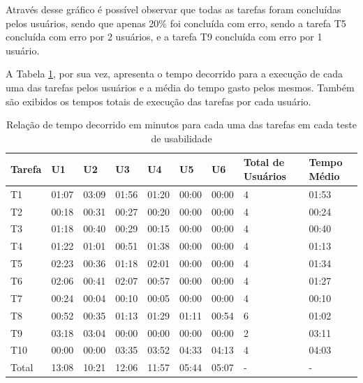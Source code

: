 Através desse gráfico é possível observar que todas as tarefas foram concluídas pelos 
usuários, sendo que apenas 20\% foi concluída com erro, sendo a tarefa T5 concluída com 
erro por 2 usuários, e a tarefa T9 concluída com erro por 1 usuário.

A Tabela \ref{table:tempos-execucao}, por sua vez, apresenta o tempo decorrido para a execução de cada uma das 
tarefas pelos usuários e a média do tempo gasto pelos mesmos. Também são exibidos os 
tempos totais de execução das tarefas por cada usuário.

\begin{table}[!htb]
    \centering
    \caption{ Relação de tempo decorrido em minutos para cada uma das tarefas em cada teste de usabilidade}
    \label{table:tempos-execucao}
    \begin{tabular}{|p{1.5cm}|p{1.2cm}|p{1.2cm}|p{1.2cm}|p{1.2cm}|p{1.2cm}|p{1.2cm}|p{1.2cm}|p{1.5cm}|}
        \hline
        Tarefa & U1 & U2 & U3 & U4 & U5 & U6 & Total de Usuários & Tempo Médio \\
        \hline
        T1 & 01:07 & 03:09 & 01:56 & 01:20 & 00:00 & 00:00 & 4 & 01:53 \\
        \hline
        T2 & 00:18 & 00:31 & 00:27 & 00:20 & 00:00 & 00:00 & 4 & 00:24 \\          
        \hline
        T3 & 01:18 & 00:40 & 00:29 & 00:15 & 00:00 & 00:00 & 4 & 00:40 \\
        \hline
        T4 & 01:22 & 01:01 & 00:51 & 01:38 & 00:00 & 00:00 & 4 & 01:13 \\
        \hline
        T5 & 02:23 & 00:36 & 01:18 & 02:01 & 00:00 & 00:00 & 4 & 01:34 \\
        \hline
        T6 & 02:06 & 00:41 & 02:07 & 00:57 & 00:00 & 00:00 & 4 & 01:27 \\
        \hline
        T7 & 00:24 & 00:04 & 00:10 & 00:05 & 00:00 & 00:00 & 4 & 00:10 \\
        \hline
        T8 & 00:52 & 00:35 & 01:13 & 01:29 & 01:11 & 00:54 & 6 & 01:02 \\
        \hline
        T9 & 03:18 & 03:04 & 00:00 & 00:00 & 00:00 & 00:00 & 2 & 03:11 \\
        \hline
        T10 & 00:00 & 00:00 & 03:35 & 03:52 & 04:33 & 04:13 & 4 & 04:03 \\
        \hline 
        Total & 13:08 & 10:21 & 12:06 & 11:57 & 05:44 & 05:07 & - & - \\
        \hline   
    \end{tabular}
\end{table}


